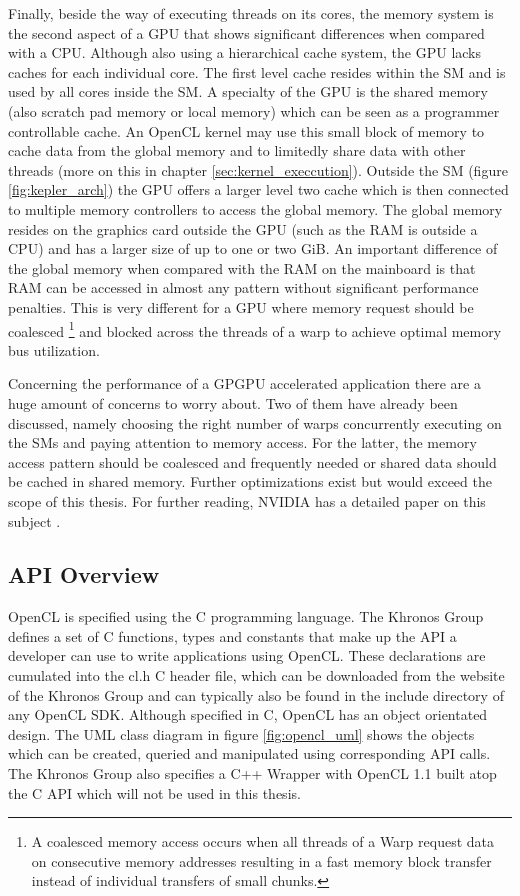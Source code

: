 Finally, beside the way of executing threads on its cores, the memory system is the second aspect of a GPU that shows significant differences when compared with a CPU. Although also using a hierarchical cache system, the GPU lacks caches for each individual core. The first level cache resides within the SM and is used by all cores inside the SM. A specialty of the GPU is the shared memory (also scratch pad memory or local memory) which can be seen as a programmer controllable cache. An OpenCL kernel may use this small block of memory to cache data from the global memory and to limitedly share data with other threads (more on this in chapter \ref{sec:kernel_execcution}). Outside the SM (figure \ref{fig:kepler_arch}) the GPU offers a larger level two cache which is then connected to multiple memory controllers to access the global memory. The global memory resides on the graphics card outside the GPU (such as the RAM is outside a CPU) and has a larger size of up to one or two GiB. An important difference of the global memory when compared with the RAM on the mainboard is that RAM can be accessed in almost any pattern without significant performance penalties. This is very different for a GPU where memory request should be coalesced \footnote{A coalesced memory access occurs when all threads of a Warp request data on consecutive memory addresses resulting in a fast memory block transfer instead of individual transfers of small chunks.} and blocked across the threads of a warp to achieve optimal memory bus utilization.

Concerning the performance of a GPGPU accelerated application there are a huge amount of concerns to worry about. Two of them have already been discussed, namely choosing the right number of warps concurrently executing on the SMs and paying attention to memory access. For the latter, the memory access pattern should be coalesced and frequently needed or shared data should be cached in shared memory. Further optimizations exist but would exceed the scope of this thesis. For further reading, NVIDIA has a detailed paper on this subject \cite{gpu_optimizations}.

\subsection{API Overview}

OpenCL is specified using the C programming language. The Khronos Group defines a set of C functions, types and constants that make up the API a developer can use to write applications using OpenCL. These declarations are cumulated into the cl.h C header file, which can be downloaded from the website of the Khronos Group and can typically also be found in the include directory of any OpenCL SDK. Although specified in C, OpenCL has an object orientated design. The UML class diagram in figure \ref{fig:opencl_uml} shows the objects which can be created, queried and manipulated using corresponding API calls. The Khronos Group also specifies a C++ Wrapper with OpenCL 1.1 built atop the C API which will not be used in this thesis.


